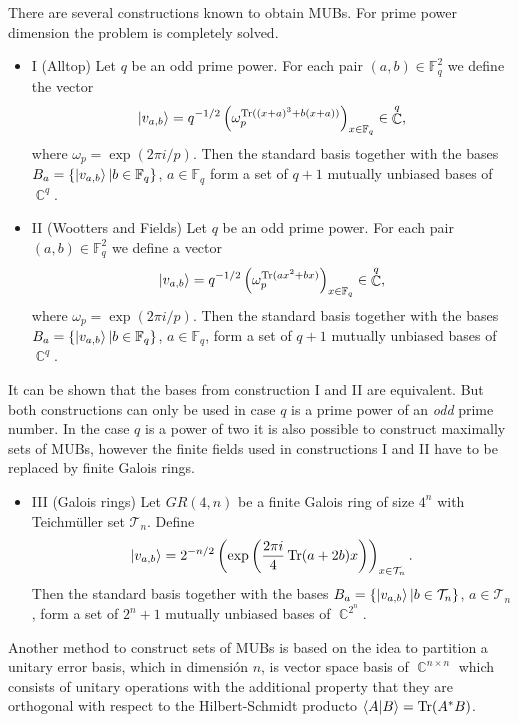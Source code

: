 \documentclass[a4paper]{article}
\DeclareMathOperator{\C}{\mathbb{C}}
\DeclareMathOperator{\Tr}{Tr}
\begin{document}
  There are several constructions known to obtain MUBs. For
  prime power dimension the problem is completely solved.

  \begin{itemize}
    \item I (Alltop) Let $q$ be an odd prime power. For each
      pair $(a,b) \in \mathbb F^2_q$ we define the vector
      \[
        \ket{v_{a,b}}
        = q^{-1 / 2} \left( \omega_p^{\Tr((x+a)^3+b(x+a))}
        \right)_{x \in \mathbb F_q} \in \C^{q},
      \] 
      where $\omega_p = \exp(2\pi i / p)$. Then the standard
      basis together with the bases $B_a = \{\ket{v_{a,b}}
      | b \in \mathbb F_q\}$, $a\in \mathbb F_q$ form a set
      of $q + 1$ mutually unbiased bases of $\C^{q}$.
    \item II (Wootters and Fields) Let $q$ be an odd prime
      power. For each pair $(a,b) \in \mathbb F^2_q$ we
      define a vector
      \[
        \ket{v_{a,b}} = q^{-1 / 2} \left(
        \omega_p^{\Tr(ax^2+bx)} \right)_{x \in \mathbb F_q}
        \in \C^{q},
      \] 
      where $\omega_p = \exp(2\pi i/p)$. Then the standard
      basis together with the bases $B_a = \{\ket{v_{a,b}} |
      b \in \mathbb F_q\}$, $a \in \mathbb F_q$, form a set
      of $q + 1$ mutually unbiased bases of $\C^{q}$.
  \end{itemize}
  It can be shown that the bases from construction I and II
  are equivalent. But both constructions can only be used in
  case $q$ is a prime power of an \textit{odd} prime number.
  In the case $q$ is a power of two it is also possible to
  construct maximally sets of MUBs, however the finite
  fields used in constructions I and II have to be replaced
  by finite Galois rings.
  \begin{itemize}
    \item III (Galois rings) Let $GR(4,n)$ be a finite
      Galois ring of size $4^{n}$ with Teichmüller set
      $\mathcal T_n$. Define
      \[
        \ket{v_{a,b}}
        = 2^{-n / 2} \left( \exp\left( \frac{2\pi i}{4}
        \Tr(a+2b)x \right) \right)_{x \in \mathcal T_n}.
      \] 
      Then the standard basis together with the bases $B_a =
      \{\ket{v_{a,b}} | b \in \mathcal T_n\}$, $a \in
      \mathcal T_n$, form a set of $2^{n}+1$ mutually
      unbiased bases of $\C^{2^{n}}$.
  \end{itemize}

  Another method to construct sets of MUBs is based on the
  idea to partition a unitary error basis, which in
  dimensión $n$, is vector space basis of $\C^{n \times n}$ 
  which consists of unitary operations with the additional
  property that they are orthogonal with respect to the
  Hilbert-Schmidt producto $\braket{A|B} = \Tr(A^{*}B)$.
\end{document}
